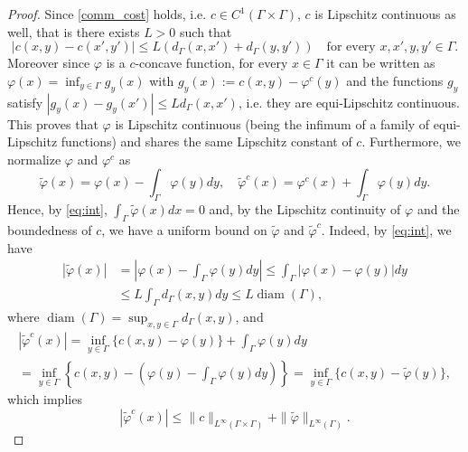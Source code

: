 \documentclass[10pt,a4paper]{amsart}
\renewcommand{\phi}{\varphi}
\begin{document}
\begin{proof}
Since \eqref{comm_cost} holds, i.e. $c\in C^1(\Gamma\times\Gamma)$, $c$ is Lipschitz continuous as well, that is there exists $L>0$ such that
$$
|c(x, y)-c(x', y')|\leq L(d_{\Gamma}(x, x')+d_{\Gamma}(y, y'))\quad\text{for every }x,x',y,y'\in\Gamma.
$$
Moreover since $\phi$ is a $c$-concave function, for every $x\in\Gamma$ it can be written as $\phi(x)=\inf_{y\in\Gamma}g_y(x)$ with $g_y(x):=c(x, y)-\phi^c(y)$ and the functions $g_y$ satisfy
$|g_y(x)-g_y(x')|\leq Ld_{\Gamma}(x, x')$, i.e. they are equi-Lipschitz continuous. This proves that $\phi$ is Lipschitz continuous (being the infimum of a family of equi-Lipschitz functions) and shares the same Lipschitz constant of $c$. Furthermore, we normalize $\phi$ and $\phi^c$ as
$$
\tilde\phi(x)=\phi(x)- \int_{\Gamma}\phi(y)dy,\quad\tilde\phi^c(x)=\phi^c(x)+\int_{\Gamma}\phi(y)dy.
$$
Hence, by \eqref{eq:int}, $\int_\Gamma\tilde\phi(x)dx=0$ and, by the Lipschitz continuity of $\phi$ and the boundedness of $c$, we have a uniform bound on $\tilde\phi$ and $\tilde\phi^c$. Indeed, by \eqref{eq:int}, we have
\begin{align*}	
 |\tilde\phi(x)|&=\left|\phi(x)-   \int_{\Gamma}\phi(y)dy\right|\leq \int_{\Gamma}|\phi(x)-\phi(y)|dy\\
&\leq   L\int_{\Gamma}d_{\Gamma}(x, y)dy\leq L\operatorname{diam}(\Gamma),
\end{align*}
where $\operatorname{diam}(\Gamma)= \sup_{x,y\in \Gamma}d_\Gamma (x,y)$, and
\begin{multline*}
|\tilde\phi^c(x)|=\inf_{y\in\Gamma}\{c(x, y)-\phi(y)\}+ \int_{\Gamma}\phi(y)dy\\
=\inf_{y\in\Gamma}\left\{c(x, y)-\left(\phi(y)- \int_{\Gamma}\phi(y)dy\right)\right\}=\inf_{y\in\Gamma}\{c(x, y)-\tilde\phi(y)\},
\end{multline*}
which implies
$$
|\tilde\phi^c(x)|\leq\|c\|_{L^{\infty}(\Gamma\times\Gamma)}+\|\tilde\phi\|_{L^{\infty}(\Gamma)}.
$$
\end{proof}
\end{document}
